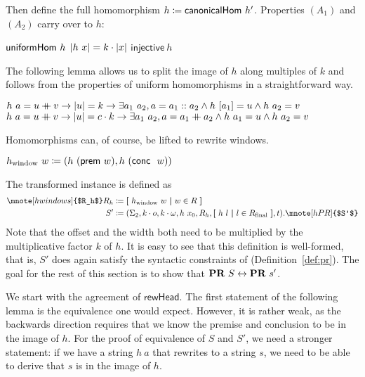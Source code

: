 Then define the full homomorphism $h \coloneqq \textsf{canonicalHom}~h'$. 
Properties $(A_1)$ and $(A_2)$ carry over to $h$:
\begin{proposition}\label{prop:h_properties}\leavevmode
  \begin{enumerate}
    \coqitem[h_unifHom] $\textsf{uniformHom}~h$
    \coqitem[h_multiplier] $|h~x| = k \cdot |x|$
    \coqitem[h_injective] $\textsf{injective}~h$
  \end{enumerate}
\end{proposition}

The following lemma allows us to split the image of $h$ along multiples of $k$ and follows from the properties of uniform homomorphisms in a straightforward way.
\begin{lemma}[Inversion of $h$]\label{lem:h_inv}\leavevmode
  \begin{enumerate}
     $h~a = u \mathbin{+\mkern-10mu+} v \rightarrow |u| = k \rightarrow \exists a_1~a_2, a = a_1 :: a_2 \land h~[a_1] = u \land h~a_2 = v$
     $h~a = u \mathbin{+\mkern-10mu+} v \rightarrow |u| = c \cdot k \rightarrow \exists a_1~a_2, a = a_1 \mathbin{+\mkern-10mu+} a_2 \land h~a_1 = u \land h~a_2 = v$ 
  \end{enumerate}
\end{lemma}

Homomorphisms can, of course, be lifted to rewrite windows. 
\begin{definition}
  $h_\text{window}~w\coloneqq (h~(\textsf{prem}~w), h~(\textsf{conc}~~w)) $
\end{definition}
The transformed \PR{} instance is defined as
\begin{align*}
  \mnote[hwindows]{$R_h$}
  R_h &\defeq \withl h_\text{window}~w \withm w \in R \withr \\
  S' &\defeq (\Sigma_2, k \cdot o, k \cdot \omega, h~x_0, R_h, \withl h~l \withm l \in \Rfinal \withr, t).
  \mnote[hPR]{$S'$}
\end{align*}
Note that the offset and the width both need to be multiplied by the multiplicative factor $k$ of $h$.
It is easy to see that this definition is well-formed, that is, $S'$ does again satisfy the syntactic constraints of \PR{} (Definition~\ref{def:pr}).
The goal for the rest of this section is to show that $\textbf{PR}{}~S \leftrightarrow \textbf{PR}{}~s'$. 

We start with the agreement of $\textsf{rewHead}$.
The first statement of the following lemma is the equivalence one would expect. However, it is rather weak, as the backwards direction requires that we know the premise and conclusion to be in the image of $h$.
For the proof of equivalence of $S$ and $S'$, we need a stronger statement: if we have a string $h~a$ that rewrites to a string $s$, we need to be able to derive that $s$ is in the image of $h$.

